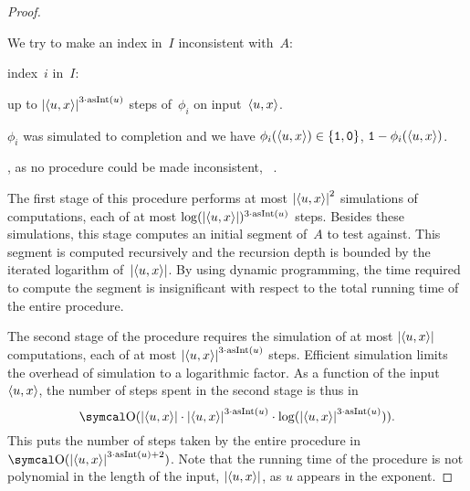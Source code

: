 \begin{proof}
\begin{codelisting}
    We try to make an index in~$I$ inconsistent with~$A$:
    \begin{codelisting}
    \item
       index~$i$ in~$I$:
      \begin{codelisting}
      \item
         up to $\length{\pair{u}{x}}^{3 \cdot \asNat(u)}$ steps of~$\phi_i$ on input~$\pair{u}{x}$.
      \item
         $\phi_i$ was simulated to completion and we have $\phi_i(\pair{u}{x}) \in \{\bits{1}, \bits{0}\}$,
        \itemcont {} $\bits{1} - \phi_i(\pair{u}{x})$.
      \end{codelisting}
    \item
      , as no procedure could be made inconsistent, ~.
    \end{codelisting}
  \end{codelisting}

  The first stage of this procedure performs at most ${\lvert{\langle u, x\rangle}\rvert}^2$ simulations of computations, each of at most $\log({\lvert{\langle u, x\rangle}\rvert})^{3 \cdot \operatorname{asInt}(u)}$ steps.
  Besides these simulations, this stage computes an initial segment of~$A$ to test against.
  This segment is computed recursively and the recursion depth is bounded by the iterated logarithm of~${\lvert{\langle u, x\rangle}\rvert}$.
  By using dynamic programming, the time required to compute the segment is insignificant with respect to the total running time of the entire procedure.

  The second stage of the procedure requires the simulation of at most ${\lvert{\langle u, x\rangle}\rvert}$ computations, each of at most ${\lvert{\langle u, x\rangle}\rvert}^{3 \cdot \operatorname{asInt}(u)}$ steps.
  Efficient simulation \parencite{arora2009computational} limits the overhead of simulation to a logarithmic factor.
  As a function of the input~${\langle u, x\rangle}$, the number of steps spent in the second stage is thus in
  \begin{equation*}
    \bigO(\length{\pair{u}{x}} \cdot \length{\pair{u}{x}}^{3 \cdot \asNat(u)} \cdot \log(\length{\pair{u}{x}}^{3 \cdot \asNat(u)})).
  \end{equation*}
  This puts the number of steps taken by the entire procedure in $\bigO(\length{\pair{u}{x}}^{3 \cdot \asNat(u) + 2})$.
  Note that the running time of the procedure is not polynomial in the length of the input, ${\lvert{\langle u, x\rangle}\rvert}$, as $u$ appears in the exponent.


\end{proof}
